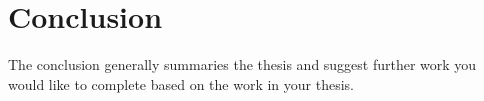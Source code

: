 \chapter{Conclusion}
The conclusion generally summaries the thesis and suggest further work you
would like to complete based on the work in your thesis.

\lipsum[20-30]